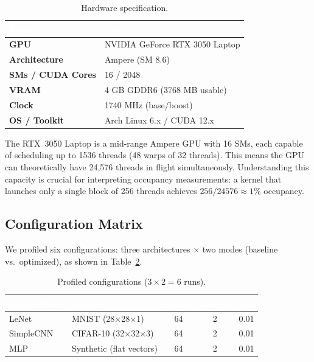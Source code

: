 \documentclass[10pt,twocolumn,letterpaper]{article}
\newcommand{\tablehead}[1]{\textcolor{white}{\textbf{#1}}}
\begin{document}
\begin{table}[H]
\centering
\caption{Hardware specification.}
\label{tab:hardware}
\scriptsize
\renewcommand{\arraystretch}{1.3}
\begin{tabular}{>{\bfseries}l l}
\toprule
\rowcolor{tableheader}
\tablehead{Property} & \tablehead{Value} \\
\midrule
\rowcolor{tablerow1}
GPU & NVIDIA GeForce RTX 3050 Laptop \\
\rowcolor{tablerow2}
Architecture & Ampere (SM 8.6) \\
\rowcolor{tablerow1}
SMs / CUDA Cores & 16 / 2048 \\
\rowcolor{tablerow2}
VRAM & 4 GB GDDR6 (3768 MB usable) \\
\rowcolor{tablerow1}
Clock & 1740 MHz (base/boost) \\
\rowcolor{tablerow2}
OS / Toolkit & Arch Linux 6.x / CUDA 12.x \\
\bottomrule
\end{tabular}
\end{table}

The RTX~3050 Laptop is a mid-range Ampere GPU with 16 SMs, each capable of scheduling up to 1536 threads (48 warps of 32 threads).
This means the GPU can theoretically have 24,576 threads in flight simultaneously.
Understanding this capacity is crucial for interpreting occupancy measurements: a kernel that launches only a single block of 256 threads achieves $256/24576 \approx 1\%$ occupancy.

\subsection{Configuration Matrix}

We profiled six configurations: three architectures $\times$ two modes (baseline vs.\ optimized), as shown in Table~\ref{tab:configs}.

\begin{table}[H]
\centering
\caption{Profiled configurations ($3 \times 2 = 6$ runs).}
\label{tab:configs}
\scriptsize
\renewcommand{\arraystretch}{1.3}
\begin{tabular}{l l c c c}
\toprule
\rowcolor{tableheader}
\tablehead{Architecture} & \tablehead{Dataset} & \tablehead{Batch} & \tablehead{Epochs} & \tablehead{LR} \\
\midrule
\rowcolor{tablerow1}
LeNet & MNIST (28$\times$28$\times$1) & 64 & 2 & 0.01 \\
\rowcolor{tablerow2}
SimpleCNN & CIFAR-10 (32$\times$32$\times$3) & 64 & 2 & 0.01 \\
\rowcolor{tablerow1}
MLP & Synthetic (flat vectors) & 64 & 2 & 0.01 \\
\bottomrule
\end{tabular}
\end{table}
\end{document}
